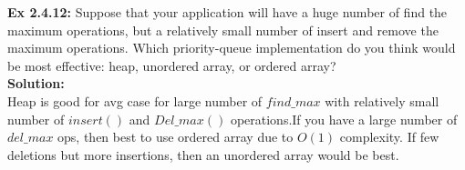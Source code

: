 \documentclass[11pt,fleqn]{article}
\begin{document}
\textbf{Ex 2.4.12:} Suppose that your application will have a huge number of find the maximum
operations, but a relatively small number of insert and remove the maximum operations.
Which priority-queue implementation do you think would be most effective: heap,
unordered array, or ordered array?\\
	
\textbf{Solution:}\\
Heap is good for avg case for large number of $find\_max$ with relatively small number of $insert()$ and $Del\_max()$ operations.If you have a large number of $del\_max$ ops, then best to use ordered array due to $O(1)$ complexity. If few deletions but more insertions, then an unordered array would be best.
\end{document}
